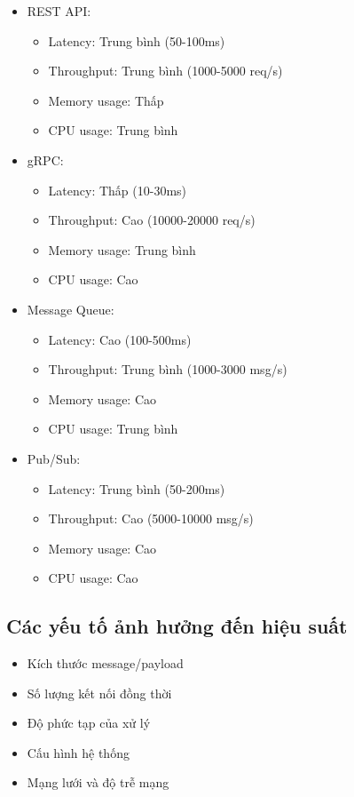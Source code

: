 \begin{itemize}
    \item REST API:
    \begin{itemize}
        \item Latency: Trung bình (50-100ms)
        \item Throughput: Trung bình (1000-5000 req/s)
        \item Memory usage: Thấp
        \item CPU usage: Trung bình
    \end{itemize}
    
    \item gRPC:
    \begin{itemize}
        \item Latency: Thấp (10-30ms)
        \item Throughput: Cao (10000-20000 req/s)
        \item Memory usage: Trung bình
        \item CPU usage: Cao
    \end{itemize}
    
    \item Message Queue:
    \begin{itemize}
        \item Latency: Cao (100-500ms)
        \item Throughput: Trung bình (1000-3000 msg/s)
        \item Memory usage: Cao
        \item CPU usage: Trung bình
    \end{itemize}
    
    \item Pub/Sub:
    \begin{itemize}
        \item Latency: Trung bình (50-200ms)
        \item Throughput: Cao (5000-10000 msg/s)
        \item Memory usage: Cao
        \item CPU usage: Cao
    \end{itemize}
\end{itemize}

\subsection{Các yếu tố ảnh hưởng đến hiệu suất}
\begin{itemize}
    \item Kích thước message/payload
    \item Số lượng kết nối đồng thời
    \item Độ phức tạp của xử lý
    \item Cấu hình hệ thống
    \item Mạng lưới và độ trễ mạng
\end{itemize}

